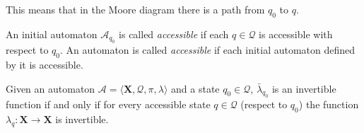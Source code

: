 \documentclass[mat1]{fmfdeloTS2.0}
\newcommand{\obs}{}				%
\newcommand{\abece}{\mathbf{X}}			%
\newcommand{\auto}{\mathcal}			%
\newcommand{\QQ}{\mathcal{Q}}			%
\newcommand{\LAMBDA}{\bar{\lambda}}			%
\begin{document}
This means that in the Moore diagram there is a path from $q_0$ to $q$.

\begin{definition}
An initial automaton $\auto{A}_{q_0}$ is called \emph{accessible} if each $q\in\QQ$ is accessible with respect to $q_0$. An automaton is called \emph{accessible} if each initial automaton defined by it is accessible.
\end{definition}

\begin{proposition}
Given an automaton $\auto{A}=\langle \abece,\QQ,\pi,\lambda\rangle$ and a state $q_0\in\QQ$, $\LAMBDA_{q_0}$ is an invertible function \obs{if and only if} for every accessible state $q\in\QQ$ (respect to $q_0$) the function $\lambda_q:\abece\longrightarrow\abece$ is invertible.
\end{proposition}
\end{document}
